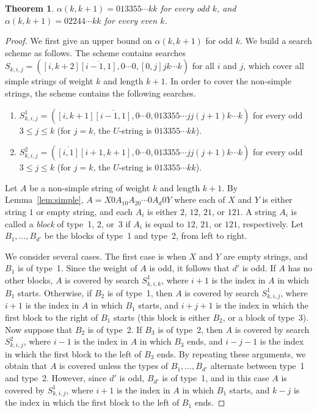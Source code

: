 \documentclass[12pt]{article}
\newtheorem{theorem}{Theorem}
\newcommand{\seq}[2]{[#1,#2]}
\newcommand{\seqr}[2]{\overline{[#1,#2]}}
\newif\iffull
\begin{document}
\begin{theorem}\label{thm:alpha}
$\alpha(k,k+1) = 013355\cdots kk$ for every odd $k$, and
$\alpha(k,k+1) = 02244\cdots kk$ for every even $k$.
\end{theorem}
\iffull
\begin{proof}
We first give an upper bound on $\alpha(k,k+1)$ for odd $k$.
We build a search scheme as follows.
The scheme contains searches 
$S_{k,i,j} = (\seq{i}{k+2}\seqr{i-1}{1},0\cdots 0,\seq{0}{j}jk\cdots k)$
for all $i$ and $j$, which cover all simple strings
of weight $k$ and length $k+1$.
In order to cover the non-simple strings, the scheme contains the following
searches.
\begin{enumerate}
\item $S_{k,i,j}^{1}=(\seq{i}{k+1}\seqr{i-1}{1},
0\cdots 0,013355\cdots jj(j+1)k\cdots k)$ for every odd $3 \leq j\leq k$
(for $j=k$, the $U$-string is $013355\cdots kk$).
\item $S_{k,i,j}^{2}=(\seqr{i}{1}\seq{i+1}{k+1},
0\cdots 0,013355\cdots jj(j+1)k\cdots k)$ for every odd $3 \leq j\leq k$
(for $j=k$, the $U$-string is $013355\cdots kk$).
\end{enumerate}

Let $A$ be a non-simple string of weight $k$ and length $k+1$.
By Lemma~\ref{lem:simple}, $A=X0A_10A_20\cdots 0 A_d0Y$ where each of $X$ and $Y$
is either string $1$ or empty string, and each $A_i$ is either
$2$, $12$, $21$, or $121$.
A string $A_i$ is called a \emph{block} of type~1, 2, or~3 if $A_i$ is
equal to $12$, $21$, or $121$, respectively.
Let $B_1,\ldots,B_{d'}$ be the blocks of type~1 and type~2, from left to right.

We consider several cases.
The first case is when $X$ and $Y$ are empty strings, and $B_1$ is of type~1.
Since the weight of $A$ is odd, it follows that $d'$ is odd.
If $A$ has no other blocks, $A$ is covered by search
$S_{k,i,k}^{1}$, where $i+1$ is the index in $A$ in which $B_1$ starts.
Otherwise, if $B_2$ is of type~1, then $A$ is covered by search
$S_{k,i,j}^{1}$, where $i+1$ is the index in $A$ in which $B_1$ starts,
and $i+j+1$ is the index in which the first block to the right of $B_1$ starts
(this block is either $B_2$, or a block of type~3).
Now suppose that $B_2$ is of type~2.
If $B_3$ is of type~2, then $A$ is covered by search
$S_{k,i,j}^{2}$, where $i-1$ is the index in $A$ in which $B_3$ ends,
and $i-j-1$ is the index in which the first block to the left of $B_3$ ends.
By repeating these arguments, we obtain that $A$ is covered unless
the types of $B_1,\ldots,B_{d'}$ alternate between type~1 and type~2.
However, since $d'$ is odd, $B_{d'}$ is of type~1, and in this case
$A$ is covered by $S_{k,i,j}^{1}$,
where $i+1$ is the index in $A$ in which $B_1$ starts,
and $k-j$ is the index in which the first block to the left of $B_1$ ends.


\end{proof}
\end{document}
